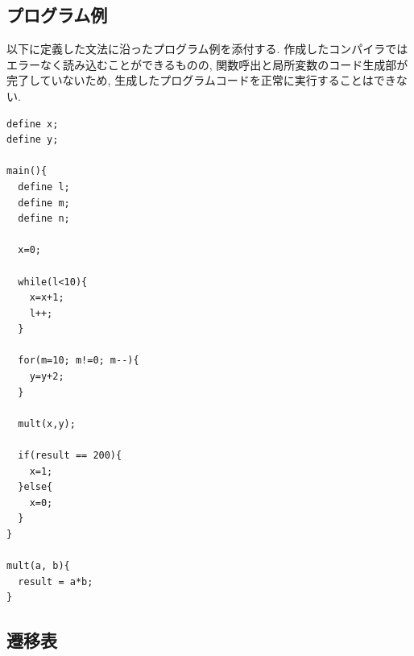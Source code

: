 \documentclass[a4j]{jarticle}
\begin{document}
\subsection{プログラム例}
以下に定義した文法に沿ったプログラム例を添付する. 
作成したコンパイラではエラーなく読み込むことができるものの, 関数呼出と局所変数のコード生成部が完了していないため, 生成したプログラムコードを正常に実行することはできない. 
\begin{verbatim}
define x;
define y;

main(){
  define l;
  define m;
  define n;

  x=0;

  while(l<10){
    x=x+1;
    l++;
  }

  for(m=10; m!=0; m--){
    y=y+2;
  }

  mult(x,y);

  if(result == 200){
    x=1;
  }else{
    x=0;
  }
}

mult(a, b){
  result = a*b;
}
\end{verbatim}

\subsection{遷移表}
\end{document}
